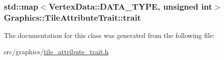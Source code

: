 \subsubsection[{trait}]{\setlength{\rightskip}{0pt plus 5cm}std\+::map$<${\bf Vertex\+Data\+::\+D\+A\+T\+A\+\_\+\+T\+Y\+P\+E}, unsigned int$>$ Graphics\+::\+Tile\+Attribute\+Trait\+::trait\hspace{0.3cm}{\ttfamily [private]}}\label{class_graphics_1_1_tile_attribute_trait_a207820d288507ca70df8f95d7fdd04db}


The documentation for this class was generated from the following file\+:\begin{DoxyCompactItemize}
\item 
src/graphics/\hyperlink{tile__attribute__trait_8h}{tile\+\_\+attribute\+\_\+trait.\+h}\end{DoxyCompactItemize}
